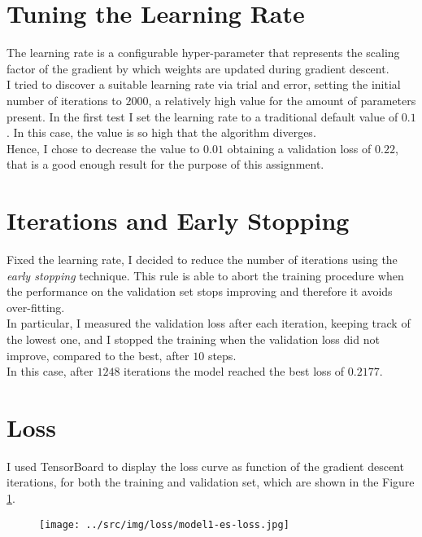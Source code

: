\documentclass[a4paper,12pt]{article} %
\begin{document}
	\section{Tuning the Learning Rate}
	The learning rate is a configurable hyper-parameter that represents the 
	scaling factor of the gradient by which weights are updated during gradient 
	descent.\\
	I tried to discover a suitable learning rate via trial and error, setting 
	the initial number of iterations to $2000$, a relatively high value for the 
	amount of parameters present.
	In the first test I set the learning rate to a traditional default value of 
	$0.1$. In this case, the value is so high that the algorithm diverges.\\
	Hence, I chose to decrease the value to $0.01$ obtaining a validation loss 
	of $0.22$, that is a good enough result for the purpose of this assignment.
	
	\section{Iterations and Early Stopping}
	Fixed the learning rate, I decided to reduce the number of iterations using 
	the \textit{early stopping} technique. This rule is able to abort the 
	training procedure when the performance on the validation set stops 
	improving and therefore it avoids over-fitting. \\
	In particular, I measured the validation loss after each iteration, keeping 
	track of the lowest one, and I stopped the training when the validation 
	loss did not improve, compared to the best, after $10$ steps.\\
	In this case, after $1248$ iterations the model reached the best loss of 
	$0.2177$.
	
	\section{Loss}
	I used {TensorBoard} to display the loss curve as function of the gradient 
	descent iterations, for both the training and validation set, which are 
	shown in the Figure \ref{fig:model1-loss}.
	
	\begin{figure}[htb]
		\centering
		\texttt{[image: ../src/img/loss/model1-es-loss.jpg]}
		\label{fig:model1-loss}
	\end{figure}
	
\end{document}
